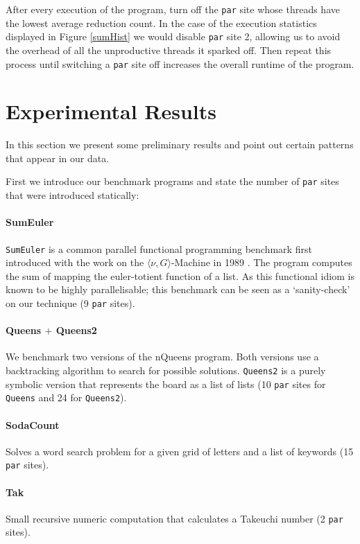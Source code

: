 After every execution of the program, turn off the \verb'par' site whose threads
have the lowest average reduction count. In the case of the execution statistics
displayed in Figure \ref{sumHist} we would disable \verb-par- site 2, allowing
us to avoid the overhead of all the unproductive threads it sparked off.  Then
repeat this process until switching a \verb'par' site off increases the overall
runtime of the program.

\section{Experimental Results}
\label{sec:results}

In this section we present some preliminary results and point out certain patterns
that appear in our data. 

First we introduce our benchmark programs and state the number of \verb-par-
sites that were introduced statically:

\paragraph{SumEuler}
\texttt{SumEuler} is a common parallel functional programming benchmark first introduced
with the work on the $\langle\nu, G\rangle$-Machine in 1989 \citep{vGMachine}.
The program computes the sum of mapping the euler-totient function of a list. As
this functional idiom is known to be highly parallelisable; this benchmark can
be seen as a `sanity-check' on our technique (9 \verb-par- sites).

\paragraph{Queens $+$ Queens2}
We benchmark two versions of the nQueens program. Both versions use a backtracking
algorithm to search for possible solutions. \texttt{Queens2} is a purely symbolic version
that represents the board as a list of lists (10 \verb-par- sites for \texttt{Queens} and
24 for \texttt{Queens2}).

\paragraph{SodaCount}
Solves a word search problem for a given grid of letters and a list of keywords
(15 \verb-par- sites).

\paragraph{Tak}
Small recursive numeric computation that calculates a Takeuchi number (2 \verb-par- sites).

